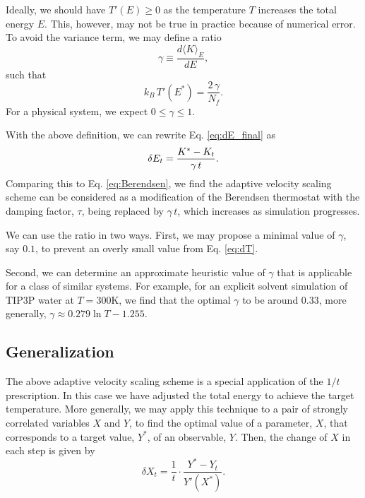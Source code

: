 \documentclass[reprint]{revtex4-1}
\begin{document}
Ideally, we should have $T'(E) \ge 0$
as the temperature $T$ increases the total energy $E$.
%
This, however, may not be true in practice
because of numerical error.
%
%
To avoid the variance term,
we may define a ratio
%
\begin{equation}
  \gamma
  \equiv
  \frac
  {
    d \langle K \rangle_E
  }
  {
    dE
  }
  ,
  \label{eq:gamma_def}
\end{equation}
%
such that
%
\begin{equation}
  k_B \, T'(E^*)
  =
  \frac{ 2 \, \gamma } { N_f }
  .
  \label{eq:dT_approx}
\end{equation}
%
For a physical system, we expect $0 \le \gamma \le 1$.
%

With the above definition, we can rewrite Eq. \eqref{eq:dE_final} as
%
\begin{equation}
  \delta E_t
  =
  \frac{ K^* - K_t } { \gamma \, t }
  .
  \notag
\end{equation}
%
Comparing this to Eq. \eqref{eq:Berendsen},
we find the adaptive velocity scaling scheme
can be considered as a modification of the Berendsen thermostat
with the damping factor, $\tau$, being replaced by $\gamma \, t$,
which increases as simulation progresses.


We can use the ratio in two ways.
%
First, we may propose a minimal value of $\gamma$, say $0.1$,
to prevent an overly small value from Eq. \eqref{eq:dT}.

Second,
we can determine an approximate heuristic value of $\gamma$
that is applicable for a class of similar systems.
%
For example,
for an explicit solvent simulation of TIP3P water\cite{jorgensen1983}
at $T = 300\mathrm K$, we find that the optimal $\gamma$
to be around $0.33$,
more generally, $\gamma \approx 0.279\ln T - 1.255$.


\subsection{Generalization}



The above adaptive velocity scaling scheme
is a special application of the $1/t$ prescription.
%
In this case we have adjusted the total energy
to achieve the target temperature.
%
More generally, we may apply this technique
to a pair of strongly correlated variables $X$ and $Y$,
to find the optimal value of a parameter, $X$,
that corresponds to a target value, $Y^*$, of an observable, $Y$.
%
Then, the change of $X$ in each step is given by
%
\begin{equation}
  \delta X_t = \frac 1 t
  \cdot
  \frac{ Y^* - Y_t }
       { Y'(X^*) }
  .
  \label{eq:invt_XY}
\end{equation}
%
\end{document}
